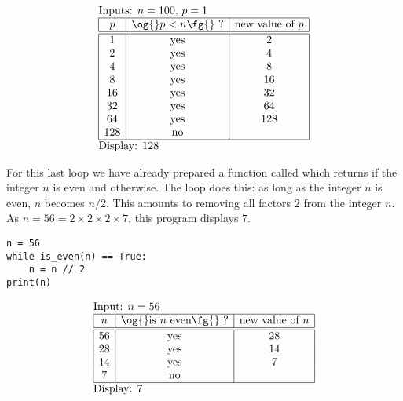 \documentclass[11pt,class=report,crop=false]{standalone}
\begin{document}
\begin{cours}
\begin{exemple}
  $$
  \begin{array}{l}
  \text{Inputs: $n=100$, $p=1$}    \\
  \begin{array}{|c|c|c|}
  \hline  
  p & \text{\og{}$p < n$\fg{} ?} & \text{new value of } p \\
  \hline\hline 
  1 & \text{yes} & 2 \\
  2 & \text{yes} & 4 \\
  4 & \text{yes} & 8 \\
  8 & \text{yes} & 16 \\  
  16 & \text{yes} & 32 \\
  32 & \text{yes} & 64 \\ 
  64 & \text{yes} & 128 \\   
  128 & \text{no} &  \\     
  \hline
  \end{array} \\
  \text{Display: $128$}  
  \end{array} 
  $$ 
  
\end{exemple}


\begin{exemple}
\begin{minipage}{0.55\textwidth}
For this last loop we have already prepared a function called  which returns  if the integer $n$ is even and  otherwise. The loop does this: as long as the integer $n$ is even, $n$ becomes $n/2$. This amounts to removing all factors $2$ from the integer $n$. As $n = 56 = 2\times 2 \times 2 \times 7$, this program displays $7$.
\end{minipage}\qquad\qquad
\begin{minipage}{0.4\textwidth}
\begin{lstlisting}
n = 56
while is_even(n) == True:
    n = n // 2
print(n)
\end{lstlisting}



\end{minipage}

  $$
  \begin{array}{l}
  \text{Input: $n=56$}    \\
  \begin{array}{|c|c|c|}
  \hline  
  n & \text{\og{}is $n$ even\fg{} ?} & \text{new value of } n \\
  \hline\hline 
  56 & \text{yes} & 28 \\
  28 & \text{yes} & 14 \\
  14 & \text{yes} & 7 \\
  7 & \text{no} &  \\ 
  \hline
  \end{array} \\
  \text{Display: $7$}  
  \end{array} 
  $$ 
\medskip


\end{exemple}
\end{cours}
\end{document}
